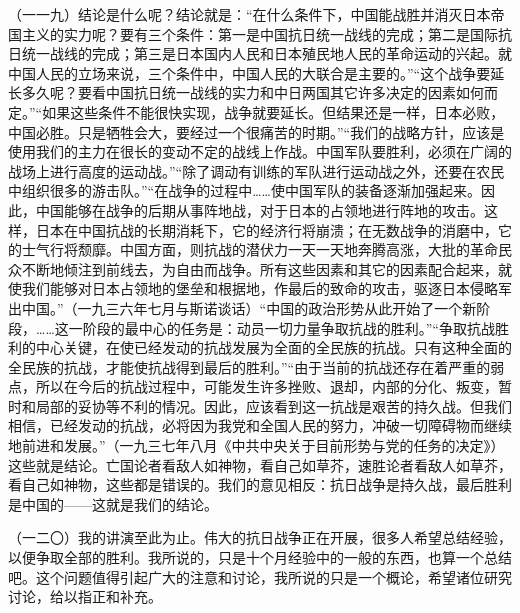 （一一九）结论是什么呢？结论就是：“在什么条件下，中国能战胜并消灭日本帝国主义的实力呢？要有三个条件：第一是中国抗日统一战线的完成；第二是国际抗日统一战线的完成；第三是日本国内人民和日本殖民地人民的革命运动的兴起。就中国人民的立场来说，三个条件中，中国人民的大联合是主要的。”“这个战争要延长多久呢？要看中国抗日统一战线的实力和中日两国其它许多决定的因素如何而定。”“如果这些条件不能很快实现，战争就要延长。但结果还是一样，日本必败，中国必胜。只是牺牲会大，要经过一个很痛苦的时期。”“我们的战略方针，应该是使用我们的主力在很长的变动不定的战线上作战。中国军队要胜利，必须在广阔的战场上进行高度的运动战。”“除了调动有训练的军队进行运动战之外，还要在农民中组织很多的游击队。”“在战争的过程中……使中国军队的装备逐渐加强起来。因此，中国能够在战争的后期从事阵地战，对于日本的占领地进行阵地的攻击。这样，日本在中国抗战的长期消耗下，它的经济行将崩溃；在无数战争的消磨中，它的士气行将颓靡。中国方面，则抗战的潜伏力一天一天地奔腾高涨，大批的革命民众不断地倾注到前线去，为自由而战争。所有这些因素和其它的因素配合起来，就使我们能够对日本占领地的堡垒和根据地，作最后的致命的攻击，驱逐日本侵略军出中国。”（一九三六年七月与斯诺谈话）“中国的政治形势从此开始了一个新阶段，……这一阶段的最中心的任务是：动员一切力量争取抗战的胜利。”“争取抗战胜利的中心关键，在使已经发动的抗战发展为全面的全民族的抗战。只有这种全面的全民族的抗战，才能使抗战得到最后的胜利。”“由于当前的抗战还存在着严重的弱点，所以在今后的抗战过程中，可能发生许多挫败、退却，内部的分化、叛变，暂时和局部的妥协等不利的情况。因此，应该看到这一抗战是艰苦的持久战。但我们相信，已经发动的抗战，必将因为我党和全国人民的努力，冲破一切障碍物而继续地前进和发展。”（一九三七年八月《中共中央关于目前形势与党的任务的决定》）这些就是结论。亡国论者看敌人如神物，看自己如草芥，速胜论者看敌人如草芥，看自己如神物，这些都是错误的。我们的意见相反：抗日战争是持久战，最后胜利是中国的——这就是我们的结论。

（一二〇）我的讲演至此为止。伟大的抗日战争正在开展，很多人希望总结经验，以便争取全部的胜利。我所说的，只是十个月经验中的一般的东西，也算一个总结吧。这个问题值得引起广大的注意和讨论，我所说的只是一个概论，希望诸位研究讨论，给以指正和补充。


